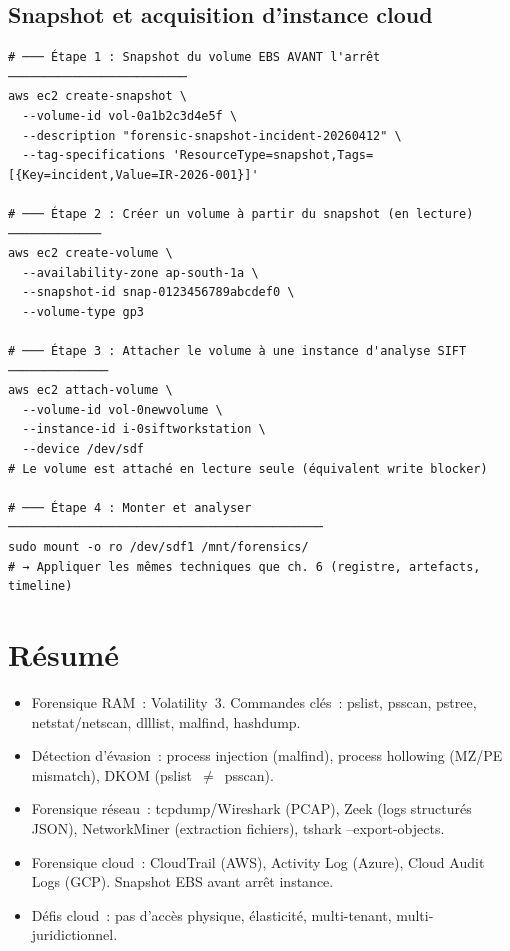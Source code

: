 \subsection{Snapshot et acquisition d'instance cloud}

\begin{lstlisting}[style=StyleTerminal,
  caption={Acquisition forensique d'une instance EC2 compromise},
  label={lst:ec2-forensics}]
# ─── Étape 1 : Snapshot du volume EBS AVANT l'arrêt ─────────────────────────
aws ec2 create-snapshot \
  --volume-id vol-0a1b2c3d4e5f \
  --description "forensic-snapshot-incident-20260412" \
  --tag-specifications 'ResourceType=snapshot,Tags=[{Key=incident,Value=IR-2026-001}]'

# ─── Étape 2 : Créer un volume à partir du snapshot (en lecture) ─────────────
aws ec2 create-volume \
  --availability-zone ap-south-1a \
  --snapshot-id snap-0123456789abcdef0 \
  --volume-type gp3

# ─── Étape 3 : Attacher le volume à une instance d'analyse SIFT ──────────────
aws ec2 attach-volume \
  --volume-id vol-0newvolume \
  --instance-id i-0siftworkstation \
  --device /dev/sdf
# Le volume est attaché en lecture seule (équivalent write blocker)

# ─── Étape 4 : Monter et analyser ────────────────────────────────────────────
sudo mount -o ro /dev/sdf1 /mnt/forensics/
# → Appliquer les mêmes techniques que ch. 6 (registre, artefacts, timeline)
\end{lstlisting}

\section*{Résumé}

\begin{boxresume}
\begin{itemize}
  \item Forensique RAM~: Volatility~3. Commandes clés~: pslist, psscan,
        pstree, netstat/netscan, dlllist, malfind, hashdump.
  \item Détection d'évasion~: process injection (malfind),
        process hollowing (MZ/PE mismatch), DKOM (pslist~$\neq$~psscan).
  \item Forensique réseau~: tcpdump/Wireshark (PCAP), Zeek (logs structurés
        JSON), NetworkMiner (extraction fichiers), tshark --export-objects.
  \item Forensique cloud~: CloudTrail (AWS), Activity Log (Azure),
        Cloud Audit Logs (GCP). Snapshot EBS avant arrêt instance.
  \item Défis cloud~: pas d'accès physique, élasticité, multi-tenant,
        multi-juridictionnel.
\end{itemize}
\end{boxresume}

